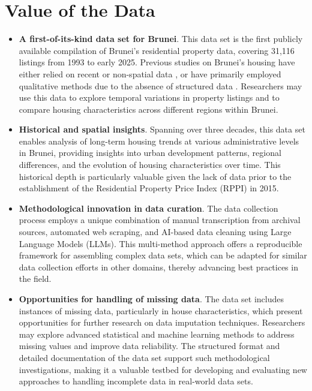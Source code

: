 \documentclass[
  number]{elsarticle}
\providecommand{\tightlist}{%
  \setlength{\itemsep}{0pt}\setlength{\parskip}{0pt}}\usepackage{longtable,booktabs,array}
\begin{document}
\section{Value of the Data}\label{value-of-the-data}

\begin{itemize}
\item
  \textbf{A first-of-its-kind data set for Brunei}. This data set is the
  first publicly available compilation of Brunei's residential property
  data, covering 31,116 listings from 1993 to early 2025. Previous
  studies on Brunei's housing have either relied on recent or
  non-spatial data \citep{ng2022characterising, jamil2025leveraging}, or
  have primarily employed qualitative methods due to the absence of
  structured data \citep{hassan2011cultural, hassan2023sociocultural}.
  Researchers may use this data to explore temporal variations in
  property listings and to compare housing characteristics across
  different regions within Brunei.
\item
  \textbf{Historical and spatial insights}. Spanning over three decades,
  this data set enables analysis of long-term housing trends at various
  administrative levels in Brunei, providing insights into urban
  development patterns, regional differences, and the evolution of
  housing characteristics over time. This historical depth is
  particularly valuable given the lack of data prior to the
  establishment of the Residential Property Price Index (RPPI)
  \citep{bdcb2021technical} in 2015.
\item
  \textbf{Methodological innovation in data curation}. The data
  collection process employs a unique combination of manual
  transcription from archival sources, automated web scraping, and
  AI-based data cleaning using Large Language Models (LLMs). This
  multi-method approach offers a reproducible framework for assembling
  complex data sets, which can be adapted for similar data collection
  efforts in other domains, thereby advancing best practices in the
  field.
\end{itemize}

\begin{itemize}
\tightlist
\item
  \textbf{Opportunities for handling of missing data}. The data set
  includes instances of missing data, particularly in house
  characteristics, which present opportunities for further research on
  data imputation techniques. Researchers may explore advanced
  statistical and machine learning methods to address missing values and
  improve data reliability. The structured format and detailed
  documentation of the data set support such methodological
  investigations, making it a valuable testbed for developing and
  evaluating new approaches to handling incomplete data in real-world
  data sets.
\end{itemize}
\end{document}
